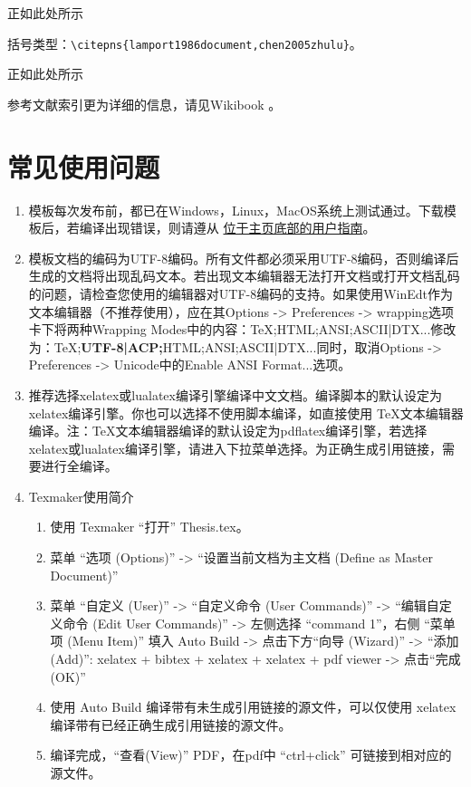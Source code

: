 正如此处所示

括号类型：\verb|\citepns{lamport1986document,chen2005zhulu}|。

正如此处所示

参考文献索引更为详细的信息，请见Wikibook\citep{wikibook2014latex} \nocite{*}。

\section{常见使用问题}\label{sec:qa}

\begin{enumerate}
    \item 模板每次发布前，都已在Windows，Linux，MacOS系统上测试通过。下载模板后，若编译出现错误，则请遵从 \href{https://github.com/mohuangrui/ucasthesis}{位于主页底部的用户指南}。

    \item 模板文档的编码为UTF-8编码。所有文件都必须采用UTF-8编码，否则编译后生成的文档将出现乱码文本。若出现文本编辑器无法打开文档或打开文档乱码的问题，请检查您使用的编辑器对UTF-8编码的支持。如果使用WinEdt作为文本编辑器（不推荐使用），应在其Options -> Preferences -> wrapping选项卡下将两种Wrapping Modes中的内容：TeX;HTML;ANSI;ASCII|DTX...修改为：TeX;\textbf{UTF-8|ACP;}HTML;ANSI;ASCII|DTX...同时，取消Options -> Preferences -> Unicode中的Enable ANSI Format...选项。

    \item 推荐选择xelatex或lualatex编译引擎编译中文文档。编译脚本的默认设定为xelatex编译引擎。你也可以选择不使用脚本编译，如直接使用 \TeX{}文本编辑器编译。注：\TeX{}文本编辑器编译的默认设定为pdflatex编译引擎，若选择xelatex或lualatex编译引擎，请进入下拉菜单选择。为正确生成引用链接，需要进行全编译。
    \item Texmaker使用简介
        \begin{enumerate}
            \footnotesize
            \item 使用 Texmaker “打开” Thesis.tex。
            \item 菜单 “选项 (Options)” -> “设置当前文档为主文档 (Define as Master Document)”
            \item 菜单 “自定义 (User)” -> “自定义命令 (User Commands)” -> “编辑自定义命令 (Edit User Commands)” -> 左侧选择 “command 1”，右侧 “菜单项 (Menu Item)” 填入 Auto Build -> 点击下方“向导 (Wizard)” -> “添加 (Add)”: xelatex + bibtex + xelatex + xelatex + pdf viewer -> 点击“完成 (OK)”
            \item 使用 Auto Build 编译带有未生成引用链接的源文件，可以仅使用 xelatex 编译带有已经正确生成引用链接的源文件。
            \item 编译完成，“查看(View)” PDF，在pdf中 “ctrl+click” 可链接到相对应的源文件。
        \end{enumerate}
    

\end{enumerate}
